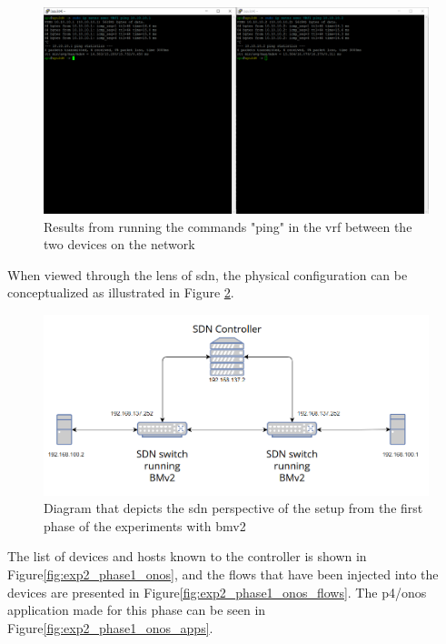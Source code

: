\begin{figure}
	\centering
	\includegraphics[width=\textwidth]{Chapters/Figures/tests/bmv2_phase_1/pings-2.PNG}
	\caption{Results from running the commands "ping" in the \gls{vrf} between the two devices on the network}
	\label{fig:exp2_phase1_pings}
\end{figure}

When viewed through the lens of \gls{sdn}, the physical configuration can be conceptualized as illustrated in Figure \ref{fig:exp2_phase1_sdn_diagram}.

\begin{figure}
	\centering
	\includegraphics[width=\textwidth]{Chapters/Figures/tests/bmv2_phase_1/sdn_diagram.PNG}
	\caption{Diagram that depicts the \gls{sdn} perspective of the setup from the first phase of the experiments with \gls{bmv2}}
	\label{fig:exp2_phase1_sdn_diagram}
\end{figure}

The list of devices and hosts known to the controller is shown in Figure\ref{fig:exp2_phase1_onos}, and the flows that have been injected into the devices are presented in Figure\ref{fig:exp2_phase1_onos_flows}. The \gls{p4}/\gls{onos} application made for this phase can be seen in Figure\ref{fig:exp2_phase1_onos_apps}.

